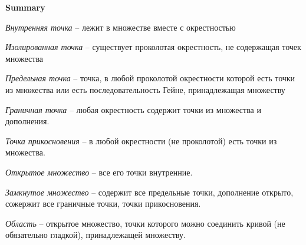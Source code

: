 \documentclass{article}
\newcommand{\bb}{\textbf}
\newcommand{\ii}{\textit}
\begin{document}
\begin{figure}[h!]
    \centering
    \vspace{-1cm}
\end{figure}
\begin{figure}[h!]
    \centering
    \vspace{-1cm}
\end{figure}
\newpage\noindent
\bb{Summary}

\ii{Внутренняя точка} -- лежит в множестве вместе с окрестностью

\ii{Изолированная точка} -- существует проколотая окрестность, не содержащая точек множества 

\ii{Предельная точка} -- точка, в любой проколотой окрестности которой есть точки из множества или есть последовательность Гейне, принадлежащая множеству

\ii{Граничная точка} -- любая окрестность содержит точки из множества и дополнения.

\ii{Точка прикосновения} -- в любой окрестности (не проколотой) есть точки из множества.

\ii{Открытое множество} -- все его точки внутренние.

\ii{Замкнутое множество} -- содержит все предельные точки, дополнение открыто, сожержит все граничные точки, точки прикосновения.

\ii{Область} -- открытое множество, точки которого можно соединить кривой (не обязательно гладкой), принадлежащей множеству.
\end{document}
